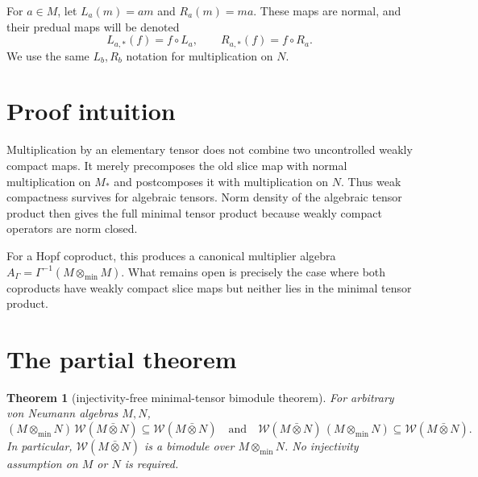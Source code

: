 \documentclass[11pt]{article}
\newtheorem{theorem}{Theorem}
\newcommand{\WC}{\mathcal W}
\begin{document}
For $a\in M$, let $L_a(m)=am$ and $R_a(m)=ma$.  These maps are normal, and
their predual maps will be denoted
\[
 L_{a,*}(f)=f\circ L_a,
 \qquad R_{a,*}(f)=f\circ R_a.
\]
We use the same $L_b,R_b$ notation for multiplication on $N$.

\section{Proof intuition}

Multiplication by an elementary tensor does not combine two uncontrolled
weakly compact maps.  It merely precomposes the old slice map with normal
multiplication on $M_*$ and postcomposes it with multiplication on $N$.
Thus weak compactness survives for algebraic tensors.  Norm density of the
algebraic tensor product then gives the full minimal tensor product because
weakly compact operators are norm closed.

For a Hopf coproduct, this produces a canonical multiplier algebra
$A_\Gamma=\Gamma^{-1}(M\otimes_{\min}M)$.  What remains open is precisely the
case where both coproducts have weakly compact slice maps but neither lies in
the minimal tensor product.

\section{The partial theorem}

\begin{theorem}[injectivity-free minimal-tensor bimodule theorem]
For arbitrary von Neumann algebras $M,N$,
\[
 (M\otimes_{\min}N)\,\WC(M\bar\otimes N)
 \subseteq\WC(M\bar\otimes N)
 \quad\text{and}\quad
 \WC(M\bar\otimes N)\,(M\otimes_{\min}N)
 \subseteq\WC(M\bar\otimes N).
\]
In particular, $\WC(M\bar\otimes N)$ is a bimodule over
$M\otimes_{\min}N$.  No injectivity assumption on $M$ or $N$ is required.
\end{theorem}
\end{document}
